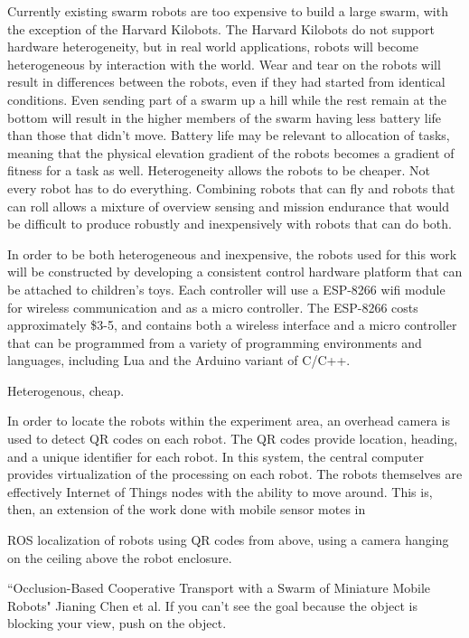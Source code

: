 \documentclass[]{article}
\begin{document}
Currently existing swarm robots are too expensive to build a large swarm, with the exception of the Harvard Kilobots. 
The Harvard Kilobots do not support hardware heterogeneity, but in real world applications, robots will become heterogeneous by interaction with the world. 
Wear and tear on the robots will result in differences between the robots, even if they had started from identical conditions. 
Even sending part of a swarm up a hill while the rest remain at the bottom will result in the higher members of the swarm having less battery life than those that didn't move. 
Battery life may be relevant to allocation of tasks, meaning that the physical elevation gradient of the robots becomes a gradient of fitness for a task as well. 
Heterogeneity allows the robots to be cheaper. 
Not every robot has to do everything.
Combining robots that can fly and robots that can roll allows a mixture of overview sensing and mission endurance that would be difficult to produce robustly and inexpensively with robots that can do both. 

In order to be both heterogeneous and inexpensive, the robots used for this work will be constructed by developing a consistent control hardware platform that can be attached to children's toys. 
Each controller will use a ESP-8266 wifi module for wireless communication and as a micro controller. 
The ESP-8266 costs approximately \$3-5, and contains both a wireless interface and a micro controller that can be programmed from a variety of programming environments and languages, including Lua and the Arduino variant of C/C++. 

Heterogenous, cheap. 

In order to locate the robots within the experiment area, an overhead camera is used to detect QR codes on each robot. 
The QR codes provide location, heading, and a unique identifier for each robot. 
In this system, the central computer provides virtualization of the processing on each robot. 
The robots themselves are effectively Internet of Things nodes with the ability to move around. 
This is, then, an extension of the work done with mobile sensor motes in 

ROS localization of robots using QR codes from above, using a camera hanging on the ceiling above the robot enclosure. 

``Occlusion-Based Cooperative Transport with a Swarm of Miniature Mobile Robots" Jianing Chen et al. If you can't see the goal because the object is blocking your view, push on the object. 
\end{document}
